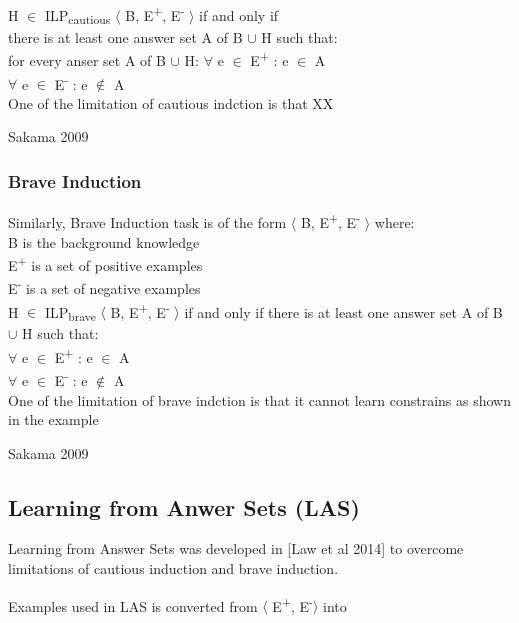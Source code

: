 \documentclass[12pt,twoside]{report}
\begin{document}
 H $\in$ ILP\textsubscript{cautious} $\langle$ B, E\textsuperscript{+}, E\textsuperscript{-} $\rangle$ if and only if  \\

 there is at least one answer set A of B $\cup$ H such that: \\
 for every anser set A of B $\cup$ H:
$\forall$ e $\in$ E\textsuperscript{+} : e $\in$ A \\
$\forall$ e $\in$ E\textsuperscript{-} : e $\notin$ A \\

One of the limitation of cautious indction is that XX

Sakama 2009


\subsubsection{Brave Induction}

Similarly, Brave Induction task is of the form $\langle$ B, E\textsuperscript{+}, E\textsuperscript{-} $\rangle$ where: \\
B is the background knowledge \\
E\textsuperscript{+} is a set of positive examples \\
E\textsuperscript{-} is a set of negative examples \\

 H $\in$ ILP\textsubscript{brave} $\langle$ B, E\textsuperscript{+}, E\textsuperscript{-} $\rangle$ if and only if there is at least one answer set A of B $\cup$ H such that: \\
$\forall$ e $\in$ E\textsuperscript{+} : e $\in$ A \\
$\forall$ e $\in$ E\textsuperscript{-} : e $\notin$ A \\

One of the limitation of brave indction is that it cannot learn constrains as shown in the example

Sakama 2009

\subsection{Learning from Anwer Sets (LAS)}

Learning from Answer Sets was developed in [Law et al 2014] to overcome limitations of cautious induction and brave induction.


Examples used in LAS is converted from $\langle$ E\textsuperscript{+}, E\textsuperscript{-}$\rangle$ into
\end{document}
